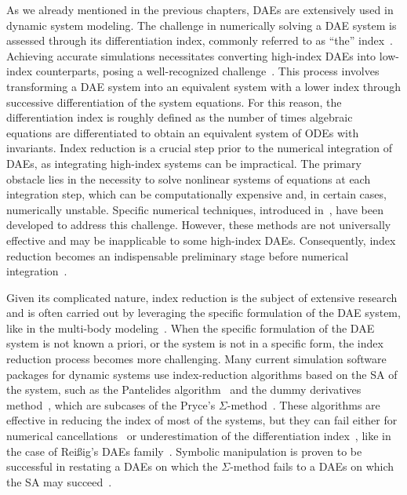 As we already mentioned in the previous chapters, \acp{DAE} are extensively used in dynamic system modeling. The challenge in numerically solving a \ac{DAE} system is assessed through its differentiation index, commonly referred to as ``the'' index~\cite{campbell1995index, campbell1995highindex}. Achieving accurate simulations necessitates converting high-index \acp{DAE} into low-index counterparts, posing a well-recognized challenge~\cite{petzold1982differential}. This process involves transforming a \ac{DAE} system into an equivalent system with a lower index through successive differentiation of the system equations. For this reason, the differentiation index is roughly defined as the number of times algebraic equations are differentiated to obtain an equivalent system of \acp{ODE} with invariants. Index reduction is a crucial step prior to the numerical integration of \acp{DAE}, as integrating high-index systems can be impractical. The primary obstacle lies in the necessity to solve nonlinear systems of equations at each integration step, which can be computationally expensive and, in certain cases, numerically unstable. Specific numerical techniques, introduced in~\cite{petzold1982differential, thomsen1999numerical, baumgarte1972stabilization}, have been developed to address this challenge. However, these methods are not universally effective and may be inapplicable to some high-index \acp{DAE}. Consequently, index reduction becomes an indispensable preliminary stage before numerical integration~\cite{lamour2013differential}.

Given its complicated nature, index reduction is the subject of extensive research and is often carried out by leveraging the specific formulation of the \ac{DAE} system, like in the multi-body modeling~\cite{zhou2005implicit, zhou2007symbolic, zhou2007symbolicseq, bayo1988modified, wehage1982generalized}. When the specific formulation of the \ac{DAE} system is not known a priori, or the system is not in a specific form, the index reduction process becomes more challenging. Many current simulation software packages for dynamic systems use index-reduction algorithms based on the \ac{SA} of the system, such as the Pantelides algorithm~\cite{pantelides1988consistent} and the dummy derivatives method~\cite{mattsson1993index}, which are subcases of the Pryce's $\Sigma$-method~\cite{pryce1998solving, pryce2001simple, nedialkov2007solvingI, nedialkov2007solvingII, nedialkov2008solvingIII, nedialkov2015algorithm, tan2016symbolic, mckenzie2017structural}. These algorithms are effective in reducing the index of most of the systems, but they can fail either for numerical cancellations~\cite{iwata2019index} or underestimation of the differentiation index~\cite{pantelides1988consistent, unger1995structural}, like in the case of Rei{\ss}ig's \acp{DAE} family~\cite{reissig2000differential}. Symbolic manipulation is proven to be successful in restating a \acp{DAE} on which the $\Sigma$-method fails to a \acp{DAE} on which the \ac{SA} may succeed~\cite{tan2016symbolic}.


